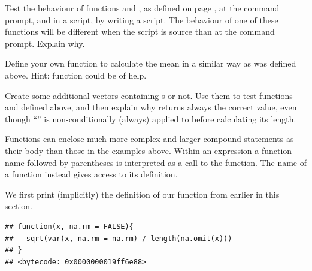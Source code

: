 \documentclass[krantz2]{krantz}\usepackage{knitr}%
\begin{document}

\begin{advplayground}
Test the behaviour of functions  and , as defined on page \pageref{chunck:print:funs}, at the command prompt, and in a script, by writing a script.
The behaviour of one of these functions will be different when the script is source than at the command prompt. Explain why.
\end{advplayground}

\begin{playground}
Define your own function to calculate the mean in a similar way as  was defined above. Hint: function  could be of help.
\end{playground}

\begin{playground}
Create some additional vectors containing s or not. Use them to test functions  and  defined above, and then explain why  returns always the correct value, even though ``'' is non-conditionally (always) applied to  before calculating its length.
\end{playground}

Functions can enclose much more complex and larger compound statements as their body than those in the examples above. Within an expression a function name followed by parentheses is interpreted as a call to the function. The name of a function instead gives access to its definition.

We first print (implicitly) the definition of our function from earlier in this section.
\begin{knitrout}\footnotesize
{}\color{fgcolor}\begin{kframe}
\begin{alltt}
\end{alltt}
\begin{verbatim}
## function(x, na.rm = FALSE){
##   sqrt(var(x, na.rm = na.rm) / length(na.omit(x)))
## }
## <bytecode: 0x0000000019ff6e88>
\end{verbatim}
\end{kframe}
\end{knitrout}
\end{document}
